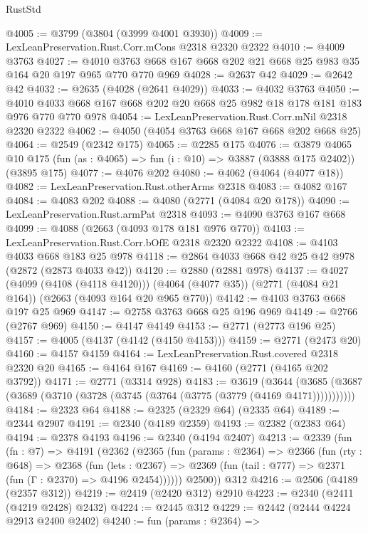 \begin{lexlean}{RustStd}
\begin{coremodule}
@4005 := @3799 (@3804 (@3999 @4001 @3930))
@4009 := LexLeanPreservation.Rust.Corr.mCons @2318 @2320 @2322
@4010 := @4009 @3763
@4027 := @4010 @3763 @668 @167 @668 @202 @21 @668 @25 @983 @35 @164 @20 @197 @965 @770 @770 @969
@4028 := @2637 @42
@4029 := @2642 @42
@4032 := @2635 (@4028 (@2641 @4029))
@4033 := @4032 @3763
@4050 := @4010 @4033 @668 @167 @668 @202 @20 @668 @25 @982 @18 @178 @181 @183 @976 @770 @770 @978
@4054 := LexLeanPreservation.Rust.Corr.mNil @2318 @2320 @2322
@4062 := @4050 (@4054 @3763 @668 @167 @668 @202 @668 @25)
@4064 := @2549 (@2342 @175)
@4065 := @2285 @175
@4076 := @3879
    @4065
    @10
    @175
    (fun (as : @4065) => fun (i : @10) => @3887 (@3888 @175 @2402))
    (@3895 @175)
@4077 := @4076 @202
@4080 := @4062 (@4064 (@4077 @18))
@4082 := LexLeanPreservation.Rust.otherArms @2318
@4083 := @4082 @167
@4084 := @4083 @202
@4088 := @4080 (@2771 (@4084 @20 @178))
@4090 := LexLeanPreservation.Rust.armPat @2318
@4093 := @4090 @3763 @167 @668
@4099 := @4088 (@2663 (@4093 @178 @181 @976 @770))
@4103 := LexLeanPreservation.Rust.Corr.bOfE @2318 @2320 @2322
@4108 := @4103 @4033 @668 @183 @25 @978
@4118 := @2864 @4033 @668 @42 @25 @42 @978 (@2872 (@2873 @4033 @42))
@4120 := @2880 (@2881 @978)
@4137 := @4027
    (@4099 (@4108 (@4118 @4120)))
    (@4064 (@4077 @35))
    (@2771 (@4084 @21 @164))
    (@2663 (@4093 @164 @20 @965 @770))
@4142 := @4103 @3763 @668 @197 @25 @969
@4147 := @2758 @3763 @668 @25 @196 @969
@4149 := @2766 (@2767 @969)
@4150 := @4147 @4149
@4153 := @2771 (@2773 @196 @25)
@4157 := @4005 (@4137 (@4142 (@4150 @4153)))
@4159 := @2771 (@2473 @20)
@4160 := @4157 @4159
@4164 := LexLeanPreservation.Rust.covered @2318 @2320 @20
@4165 := @4164 @167
@4169 := @4160 (@2771 (@4165 @202 @3792))
@4171 := @2771 (@3314 @928)
@4183 := @3619
    (@3644 (@3685 (@3687 (@3689 (@3710 (@3728 (@3745 (@3764 (@3775 (@3779 (@4169 @4171)))))))))))
@4184 := @2323 @64
@4188 := @2325 (@2329 @64) (@2335 @64)
@4189 := @2344 @2907
@4191 := @2340 (@4189 @2359)
@4193 := @2382 (@2383 @64)
@4194 := @2378 @4193
@4196 := @2340 (@4194 @2407)
@4213 := @2339
    (fun (fn : @7) =>
    @4191
      (@2362
        (@2365
          (fun (params : @2364) =>
          @2366
            (fun (rty : @648) =>
            @2368
              (fun (lets : @2367) =>
              @2369 (fun (tail : @777) => @2371 (fun (Γ : @2370) => @4196 @2454))))))
        @2500))
    @312
@4216 := @2506 (@4189 (@2357 @312))
@4219 := @2419 (@2420 @312) @2910
@4223 := @2340 (@2411 (@4219 @2428) @2432)
@4224 := @2445 @312
@4229 := @2442 (@2444 @4224 @2913 @2400 @2402)
@4240 := fun (params : @2364) =>

\end{coremodule}
\end{lexlean}
